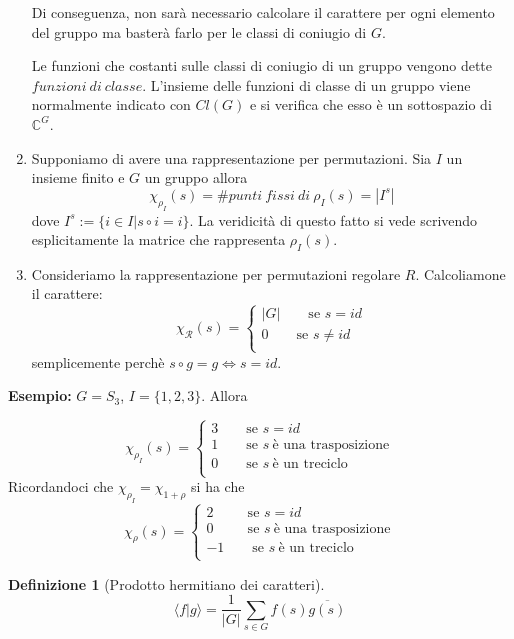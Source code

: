 \documentclass[11pt]{article}
\theoremstyle{plain}
\theoremstyle{definition}
\newtheorem{defn}{Definizione}[section]
\theoremstyle{remark}
\newcommand{\dsum}{\displaystyle\sum}
\begin{document}
\begin{enumerate}
Di conseguenza, non sarà necessario calcolare il carattere per ogni elemento del gruppo ma basterà farlo per le classi di coniugio di $G$.

Le funzioni che costanti sulle classi di coniugio di un gruppo vengono dette $funzioni\ di\ classe$. L'insieme delle funzioni di classe di un gruppo viene normalmente indicato con $Cl(G)$ e si verifica che esso è un sottospazio di $\mathbb{C}^G$.
	\item Supponiamo di avere una rappresentazione per permutazioni. Sia $I$ un insieme finito e $G$ un gruppo allora 
$$\chi_{\rho_{I}}(s)=\#punti\ fissi\ di\ \rho_I(s)=|I^s|$$
dove $I^s:=\{i\in I| s\circ i=i\}$. La veridicità di questo fatto si vede scrivendo esplicitamente la matrice che rappresenta $\rho_I(s)$.
	\item Consideriamo la rappresentazione per permutazioni regolare $R$. Calcoliamone il carattere:
	\[ \chi_{\mathcal{R}}(s) = \begin{cases}
|G| \qquad \text{se } s=id \\
0 \qquad \text{se } s\neq id\\
\end{cases} \]
semplicemente perchè $s\circ g=g\Leftrightarrow s=id$.
\end{enumerate}
\textbf{Esempio:} $G=S_3$, $I=\{1,2,3\}$. Allora

\[ \chi_{\rho_I}(s) = \begin{cases}
3 \qquad \text{se } s=id \\
1 \qquad \text{se } s\ \text{è una trasposizione}\\
0 \qquad \text{se } s\ \text{è un treciclo}\\
\end{cases} \]
Ricordandoci che $\chi_{\rho_I}=\chi_{1+\rho}$ si ha che 
\[ \chi_{\rho}(s) = \begin{cases}
2 \qquad \ \ \text{se } s=id \\
0 \qquad \ \ \text{se } s\ \text{è una trasposizione}\\
-1\qquad \text{se } s\ \text{è un treciclo}\\
\end{cases} \]

\begin{defn}[Prodotto hermitiano dei caratteri]

\[ \langle f | g \rangle = \dfrac{1}{|G|} \dsum_{s \in G} f(s)\overline{ g(s)} \]

\end{defn}
\end{document}
